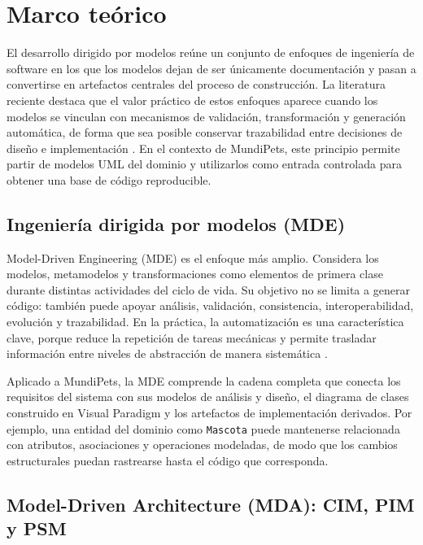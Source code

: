 \documentclass[journal,onecolumn]{IEEEtran}
\begin{document}
	\section{Marco teórico}
	
	El desarrollo dirigido por modelos reúne un conjunto de enfoques de ingeniería de software en los que los modelos dejan de ser únicamente documentación y pasan a convertirse en artefactos centrales del proceso de construcción. La literatura reciente destaca que el valor práctico de estos enfoques aparece cuando los modelos se vinculan con mecanismos de validación, transformación y generación automática, de forma que sea posible conservar trazabilidad entre decisiones de diseño e implementación \cite{sebastian2020codegen, diruscio2022lowcode, david2023collaborative}. En el contexto de MundiPets, este principio permite partir de modelos UML del dominio y utilizarlos como entrada controlada para obtener una base de código reproducible.
	
	\subsection{Ingeniería dirigida por modelos (MDE)}
	
	Model-Driven Engineering (MDE) es el enfoque más amplio. Considera los modelos, metamodelos y transformaciones como elementos de primera clase durante distintas actividades del ciclo de vida. Su objetivo no se limita a generar código: también puede apoyar análisis, validación, consistencia, interoperabilidad, evolución y trazabilidad. En la práctica, la automatización es una característica clave, porque reduce la repetición de tareas mecánicas y permite trasladar información entre niveles de abstracción de manera sistemática \cite{diruscio2022lowcode, david2023collaborative, krouwel2024enterprise}.
	
	Aplicado a MundiPets, la MDE comprende la cadena completa que conecta los requisitos del sistema con sus modelos de análisis y diseño, el diagrama de clases construido en Visual Paradigm y los artefactos de implementación derivados. Por ejemplo, una entidad del dominio como \texttt{Mascota} puede mantenerse relacionada con atributos, asociaciones y operaciones modeladas, de modo que los cambios estructurales puedan rastrearse hasta el código que corresponda.
	
	\subsection{Model-Driven Architecture (MDA): CIM, PIM y PSM}
	
\end{document}
